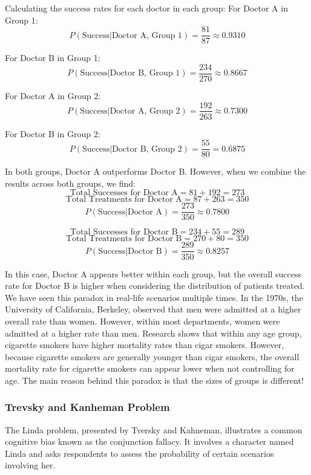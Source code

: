 Calculating the success rates for each doctor in each group:
For Doctor A in Group 1:
\[
P(\text{Success} | \text{Doctor A, Group 1}) = \frac{81}{87} \approx 0.9310
\]

For Doctor B in Group 1:
\[
P(\text{Success} | \text{Doctor B, Group 1}) = \frac{234}{270} \approx 0.8667
\]

For Doctor A in Group 2:
\[
P(\text{Success} | \text{Doctor A, Group 2}) = \frac{192}{263} \approx 0.7300
\]

For Doctor B in Group 2:
\[
P(\text{Success} | \text{Doctor B, Group 2}) = \frac{55}{80} = 0.6875
\]

In both groups, Doctor A outperforms Doctor B. However, when we combine the results across both groups, we find:
\[
\text{Total Successes for Doctor A} = 81 + 192 = 273
\]
\[
\text{Total Treatments for Doctor A} = 87 + 263 = 350
\]
\[
P(\text{Success} | \text{Doctor A}) = \frac{273}{350} \approx 0.7800
\]

\[
\text{Total Successes for Doctor B} = 234 + 55 = 289
\]
\[
\text{Total Treatments for Doctor B} = 270 + 80 = 350
\]
\[
P(\text{Success} | \text{Doctor B}) = \frac{289}{350} \approx 0.8257
\]

In this case, Doctor A appears better within each group, but the overall success rate for Doctor B is higher when considering the distribution of patients treated.\\

We have seen this paradox in real-life scenarios multiple times. In the 1970s, the University of California, Berkeley, observed that men were admitted at a higher overall rate than women. However, within most departments, women were admitted at a higher rate than men. Research shows that within any age group, cigarette smokers have higher mortality rates than cigar smokers. However, because cigarette smokers are generally younger than cigar smokers, the overall mortality rate for cigarette smokers can appear lower when not controlling for age. The main reason behind this paradox is that the sizes of groups is different!\\

\subsubsection{Trevsky and Kanheman Problem}

The Linda problem, presented by Tversky and Kahneman, illustrates a common cognitive bias known as the conjunction fallacy. It involves a character named Linda and asks respondents to assess the probability of certain scenarios involving her.\\

